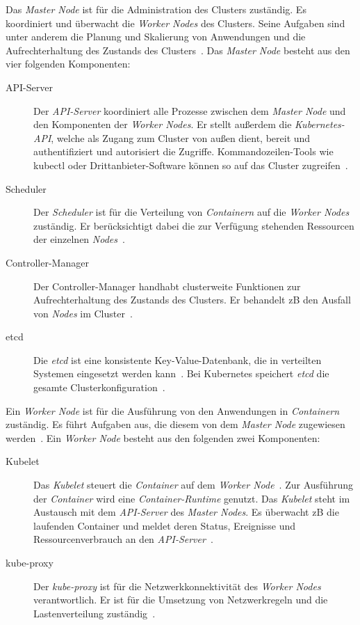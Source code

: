 Das \textit{Master Node} ist für die Administration des Clusters zuständig. Es koordiniert und überwacht die \textit{Worker Nodes} des Clusters.
Seine Aufgaben sind unter anderem die Planung und Skalierung von Anwendungen und die Aufrechterhaltung des Zustands des Clusters~\cite{kubernetes-cluster-vmware}.
Das \textit{Master Node} besteht aus den vier folgenden Komponenten:
\begin{description}
      \item[API-Server]
            Der \textit{API-Server} koordiniert alle Prozesse zwischen dem \textit{Master Node} und den Komponenten der \textit{Worker Nodes}.
            Er stellt außerdem die \textit{Kubernetes-API}, welche als Zugang zum Cluster von außen dient, bereit und authentifiziert und autorisiert die Zugriffe.
            Kommandozeilen-Tools wie kubectl oder Drittanbieter-Software können so auf das Cluster zugreifen~\cite{kubernetes-devopscube}.
      \item[Scheduler]
            Der \textit{Scheduler} ist für die Verteilung von \textit{Containern} auf die \textit{Worker Nodes} zuständig.
            Er berücksichtigt dabei die zur Verfügung stehenden Ressourcen der einzelnen \textit{Nodes}~\cite{kubernetes-cluster-ionos}.
      \item[Controller-Manager]
            Der Controller-Manager handhabt clusterweite Funktionen zur Aufrechterhaltung des Zustands des Clusters. Er behandelt \ac{zB} den Ausfall von \textit{Nodes}
            im Cluster~\cite{kubernetes-in-action-introduction}.
      \item[etcd]
            Die \textit{etcd} ist eine konsistente Key-Value-Datenbank, die in verteilten Systemen eingesetzt werden kann~\cite{etcd-ibm}.
            Bei Kubernetes speichert \textit{etcd} die gesamte Clusterkonfiguration~\cite{kubernetes-in-action-introduction}.
\end{description}

Ein \textit{Worker Node} ist für die Ausführung von den Anwendungen in \textit{Containern} zuständig.
Es führt Aufgaben aus, die diesem von dem \textit{Master Node} zugewiesen werden~\cite{kubernetes-cluster-vmware}.
Ein \textit{Worker Node} besteht aus den folgenden zwei Komponenten:
\begin{description}
      \item[Kubelet]
            Das \textit{Kubelet} steuert die \textit{Container} auf dem \textit{Worker Node}~\cite{kubernetes-in-action-introduction}.
            Zur Ausführung der \textit{Container} wird eine \textit{Container-Runtime} genutzt.
            Das \textit{Kubelet} steht im Austausch mit dem \textit{API-Server} des \textit{Master Nodes}. Es überwacht \ac{zB} die laufenden Container
            und meldet deren Status, Ereignisse und Ressourcenverbrauch an den \textit{API-Server}~\cite{kubernetes-in-action-chapter-11}.
      \item[kube-proxy]
            Der \textit{kube-proxy} ist für die Netzwerkkonnektivität des \textit{Worker Nodes} verantwortlich.
            Er ist für die Umsetzung von Netzwerkregeln und die Lastenverteilung zuständig~\cite{kubernetes-in-action-introduction,kubernetes-cluster-vmware}.
\end{description}

